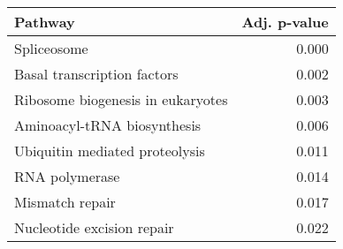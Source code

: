 \begin{tabular}{lr}
\toprule
                           Pathway &  Adj. p-value \\
\midrule
                       Spliceosome &         0.000 \\
       Basal transcription factors &         0.002 \\
 Ribosome biogenesis in eukaryotes &         0.003 \\
       Aminoacyl-tRNA biosynthesis &         0.006 \\
    Ubiquitin mediated proteolysis &         0.011 \\
                    RNA polymerase &         0.014 \\
                   Mismatch repair &         0.017 \\
        Nucleotide excision repair &         0.022 \\
\bottomrule
\end{tabular}
